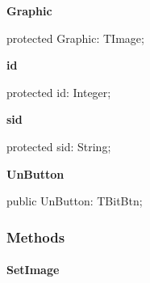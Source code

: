 \documentclass{report}
\newif\ifpdf
\begin{document}
\begin{list}{}
\par  \label{utilities.TListEntry-Graphic}
\item[\textbf{Graphic}\hfill]
\ifpdf
\begin{flushleft}
\fi
\begin{ttfamily}
protected Graphic: TImage;\end{ttfamily}

\ifpdf
\end{flushleft}
\fi


\par  \label{utilities.TListEntry-id}
\item[\textbf{id}\hfill]
\ifpdf
\begin{flushleft}
\fi
\begin{ttfamily}
protected id: Integer;\end{ttfamily}

\ifpdf
\end{flushleft}
\fi


\par  \label{utilities.TListEntry-sid}
\item[\textbf{sid}\hfill]
\ifpdf
\begin{flushleft}
\fi
\begin{ttfamily}
protected sid: String;\end{ttfamily}

\ifpdf
\end{flushleft}
\fi


\par  \label{utilities.TListEntry-UnButton}
\item[\textbf{UnButton}\hfill]
\ifpdf
\begin{flushleft}
\fi
\begin{ttfamily}
public UnButton: TBitBtn;\end{ttfamily}

\ifpdf
\end{flushleft}
\fi


\par  \end{list}
\subsubsection*{\large{\textbf{Methods}}\normalsize\hspace{1ex}\hfill}
\paragraph*{SetImage}\hspace*{\fill}
\end{document}

